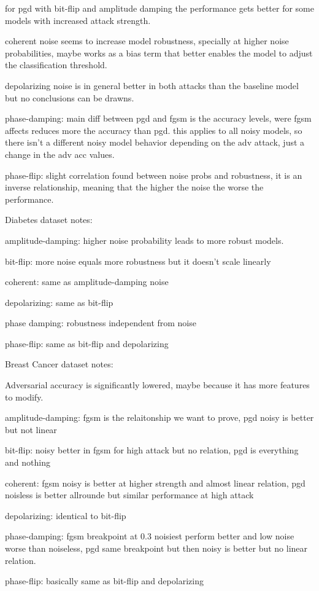 for pgd with bit-flip and amplitude damping the performance gets better
for some models with increased attack strength. \

coherent noise seems to increase model robustness, specially at higher noise
probabilities, maybe works as a bias term that better enables the model
to adjust the classification threshold. \

depolarizing noise is in general better in both attacks than the baseline
model but no conclusions can be drawns. \

phase-damping: main diff between pgd and fgsm is the accuracy levels,
were fgsm affects reduces more the accuracy than pgd. this applies to
all noisy models, so there isn't a different noisy model behavior
depending on the adv attack, just a change in the adv acc values. \

phase-flip: slight correlation found between noise probs and robustness,
it is an inverse relationship, meaning that the higher the noise the worse
the performance.

Diabetes dataset notes: \

amplitude-damping: higher noise probability leads to more robust models. \

bit-flip: more noise equals more robustness but it doesn't scale linearly \

coherent: same as amplitude-damping noise \

depolarizing:  same as bit-flip \

phase damping: robustness independent from noise \

phase-flip: same as bit-flip and depolarizing \

Breast Cancer dataset notes: \

Adversarial accuracy is significantly lowered, maybe because it has
more features to modify. \

amplitude-damping: fgsm is the relaitonship we want to prove, pgd noisy is better but not linear \

bit-flip: noisy better in fgsm for high attack but no relation, pgd is everything and nothing \

coherent: fgsm noisy is better at higher strength and almost linear relation, pgd noisless is better allrounde but similar performance at high attack \

depolarizing: identical to bit-flip

phase-damping: fgsm breakpoint at 0.3 noisiest perform better and low noise worse than noiseless, pgd same breakpoint but then noisy is better but no linear relation. \

phase-flip: basically same as bit-flip and depolarizing \

\fi